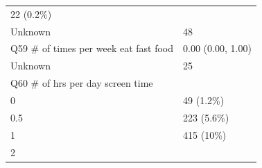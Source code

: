 \documentclass[]{article}
\begin{document}
\begin{longtable}[]{@{}ll@{}}
\begin{minipage}[t]{0.23\columnwidth}
22 (0.2\%)\strut
\end{minipage}\tabularnewline
\begin{minipage}[t]{0.71\columnwidth}\raggedright
Unknown\strut
\end{minipage} & \begin{minipage}[t]{0.23\columnwidth}\raggedright
48\strut
\end{minipage}\tabularnewline
\begin{minipage}[t]{0.71\columnwidth}\raggedright
Q59 \# of times per week eat fast food\strut
\end{minipage} & \begin{minipage}[t]{0.23\columnwidth}\raggedright
0.00 (0.00, 1.00)\strut
\end{minipage}\tabularnewline
\begin{minipage}[t]{0.71\columnwidth}\raggedright
Unknown\strut
\end{minipage} & \begin{minipage}[t]{0.23\columnwidth}\raggedright
25\strut
\end{minipage}\tabularnewline
\begin{minipage}[t]{0.71\columnwidth}\raggedright
Q60 \# of hrs per day screen time\strut
\end{minipage} & \begin{minipage}[t]{0.23\columnwidth}\raggedright
\strut
\end{minipage}\tabularnewline
\begin{minipage}[t]{0.71\columnwidth}\raggedright
0\strut
\end{minipage} & \begin{minipage}[t]{0.23\columnwidth}\raggedright
49 (1.2\%)\strut
\end{minipage}\tabularnewline
\begin{minipage}[t]{0.71\columnwidth}\raggedright
0.5\strut
\end{minipage} & \begin{minipage}[t]{0.23\columnwidth}\raggedright
223 (5.6\%)\strut
\end{minipage}\tabularnewline
\begin{minipage}[t]{0.71\columnwidth}\raggedright
1\strut
\end{minipage} & \begin{minipage}[t]{0.23\columnwidth}\raggedright
415 (10\%)\strut
\end{minipage}\tabularnewline
\begin{minipage}[t]{0.71\columnwidth}\raggedright
2\strut
\end{minipage} & \begin{minipage}[t]{0.23\columnwidth}\raggedright

\end{minipage}
\end{longtable}
\end{document}
